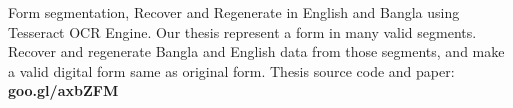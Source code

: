 \begin{cventries}
  \cventry
    {}
    {Form segmentation, Recover and Regenerate in English and Bangla using Tesseract OCR Engine.}
    {}
    {}
    {
        Our thesis represent a form in many valid segments. Recover and regenerate Bangla and English data from those
        segments, and make a valid digital form same as original form. \newline
    Thesis source code and paper: \textbf{goo.gl/axbZFM}
    }
  {}
\end{cventries}

